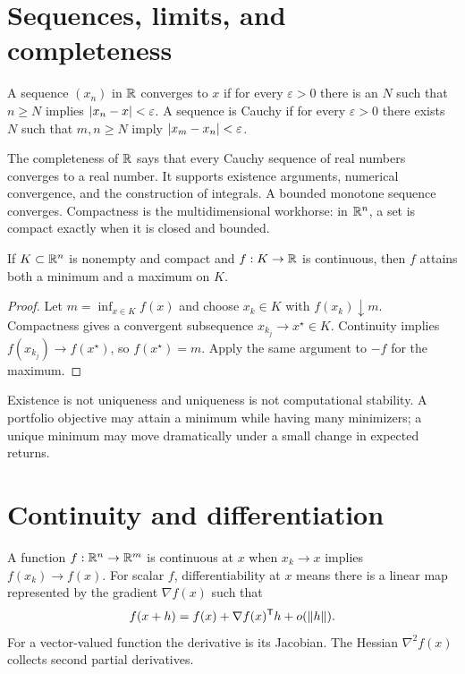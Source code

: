 \section{Sequences, limits, and completeness}

\begin{definition}[Convergence]
A sequence $(x_n)$ in $\mathbb R$ converges to $x$ if for every $\varepsilon>0$ there is an
$N$ such that $n\geq N$ implies $\left|x_n-x\right|<\varepsilon$. A sequence is Cauchy if
for every $\varepsilon>0$ there exists $N$ such that $m,n\geq N$ imply
$\left|x_m-x_n\right|<\varepsilon$.
\end{definition}

The completeness of $\mathbb R$ says that every Cauchy sequence of real numbers converges
to a real number. It supports existence arguments, numerical convergence, and the
construction of integrals. A bounded monotone sequence converges. Compactness is the
multidimensional workhorse: in $\mathbb R^n$, a set is compact exactly when it is closed and
bounded.

\begin{theorem}
If $K\subset\mathbb R^n$ is nonempty and compact and $f:K\to\mathbb R$ is continuous, then $f$
attains both a minimum and a maximum on $K$.
\end{theorem}
\begin{proof}
Let $m=\inf_{x\in K}f(x)$ and choose $x_k\in K$ with $f(x_k)\downarrow m$.
Compactness gives a convergent subsequence $x_{k_j}\to x^\star\in K$. Continuity
implies $f(x_{k_j})\to f(x^\star)$, so $f(x^\star)=m$. Apply the same argument to
$-f$ for the maximum.
\end{proof}

Existence is not uniqueness and uniqueness is not computational stability. A
portfolio objective may attain a minimum while having many minimizers; a unique
minimum may move dramatically under a small change in expected returns.

\section{Continuity and differentiation}

A function $f:\mathbb R^n\to\mathbb R^m$ is continuous at $x$ when $x_k\to x$ implies
$f(x_k)\to f(x)$. For scalar $f$, differentiability at $x$ means there is a linear
map represented by the gradient $\nabla f(x)$ such that
\[
f(x+h)=f(x)+\nabla f(x)^\mathsf T h+o(\left\lVert h\right\rVert).
\]
For a vector-valued function the derivative is its Jacobian. The Hessian
$\nabla^2f(x)$ collects second partial derivatives.

